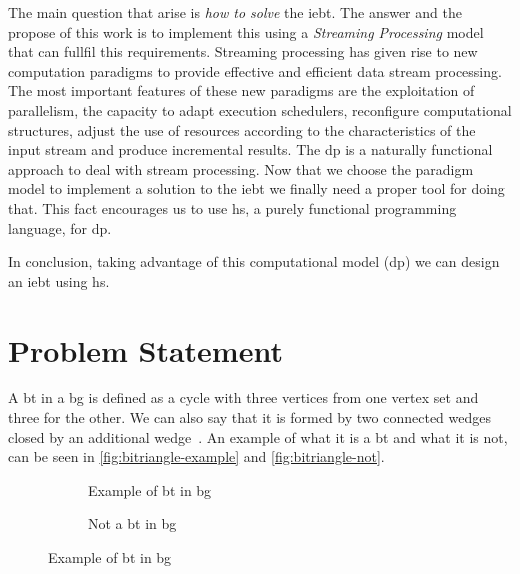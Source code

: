 The main question that arise is \emph{how to solve} the \acrshort{iebt}. The answer and the propose of this work is to implement this using a \emph{Streaming Processing} model that can fullfil this requirements.
Streaming processing has given rise to new computation paradigms to provide effective and efficient data stream processing.
The most important features of these new paradigms are the exploitation of parallelism, the capacity to adapt execution schedulers, 
reconfigure computational structures, adjust the use of resources according to the characteristics of the input stream and produce incremental results. 
The \acrfull{dp} is a naturally functional approach to deal with stream processing. 
Now that we choose the paradigm model to implement a solution to the \acrshort{iebt} we finally need a proper tool for doing that. 
This fact encourages us to use \acrlong{hs}, a purely functional programming language, for \acrshort{dp}.

In conclusion, taking advantage of this computational model (\acrshort{dp}) we can design an \acrshort{iebt} using \acrshort{hs}.

\section{Problem Statement}
A \acrlong{bt} in a \acrlong{bg} is defined as a cycle with three vertices from one vertex set and three for the other. We can also say that it is formed by two connected wedges closed by an additional wedge~\cite{btcount}.
An example of what it is a \acrshort{bt} and what it is not, can be seen in \autoref{fig:bitriangle-example} and \autoref{fig:bitriangle-not}.


\begin{figure}[htp!]
\begin{subfigure}[b]{0.5\textwidth}
\centering
{}
\caption{Example of \acrshort{bt} in \acrshort{bg}}
\label{fig:bitriangle-example}
\end{subfigure}
\begin{subfigure}[b]{0.5\textwidth}
\centering
{}
\caption{Not a \acrshort{bt} in \acrshort{bg}}
\label{fig:bitriangle-not}
\end{subfigure}
\caption[Example of \acrshort{bt} in \acrshort{bg}]{Example of \acrshort{bt} in \acrshort{bg}}
\end{figure}

